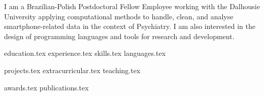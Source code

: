 \documentclass[letterpaper,11pt]{article}
\begin{document}
\newpage


\vspace{0.35cm}
{\justifying
I am a Brazilian-Polish Postdoctoral Fellow Employee working with the Dalhousie University applying computational methods to handle, clean, and analyse smartphone-related data in the context of Psychiatry. %
I am also interested in the design of programming languages and tools for research and development. %


}

{education.tex}
{experience.tex}
\newpage
\sidebyside
    {{skills.tex}}
    {{languages.tex}}


{projects.tex}
{extracurricular.tex}
{teaching.tex}

{awards.tex}
{publications.tex}
\end{document}
